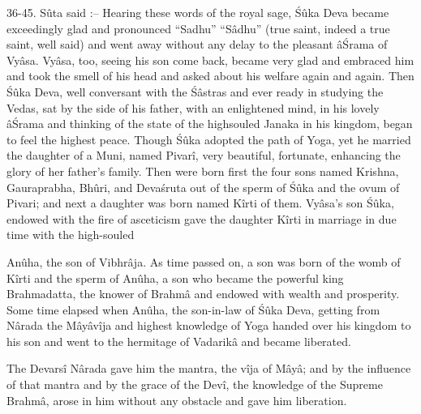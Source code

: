 36-45. S\^uta said :-- Hearing these words of the royal sage, \'S\^uka Deva became exceedingly glad and pronounced ``Sadhu'' ``S\^adhu'' (true saint, indeed a true saint, well said) and went away without any delay to the pleasant \^a\'Srama of Vy\^asa. Vy\^asa, too, seeing his son come back, became very glad and embraced him and took the smell of his head and asked about his welfare again and again. Then \'S\^uka Deva, well conversant with the \'S\^astras and ever ready in studying the Vedas, sat by the side of his father, with an enlightened mind, in his lovely \^a\'Srama and thinking of the state of the highsouled Janaka in his kingdom, began to feel the highest peace. Though \'S\^uka adopted the path of Yoga, yet he married the daughter of a Muni, named Pivar\^i, very beautiful, fortunate, enhancing the glory of her father's family. Then were born first the four sons named Krishna, Gauraprabha, Bh\^uri, and Deva\'sruta out of the sperm of \'S\^uka and the ovum of Pivari; and next a daughter was born named K\^irti of them. Vy\^asa's son \'S\^uka, endowed with the fire of asceticism gave the daughter K\^irti in marriage in due time with the high-souled

An\^uha, the son of Vibhr\^aja. As time passed on, a son was born of the womb of K\^irti and the sperm of An\^uha, a son who became the powerful king Brahmadatta, the knower of Brahm\^a and endowed with wealth and prosperity. Some time elapsed when An\^uha, the son-in-law of \'S\^uka Deva, getting from N\^arada the M\^ay\^av\^ija and highest knowledge of Yoga handed over his kingdom to his son and went to the hermitage of Vadarik\^a and became liberated.

The Devars\^i N\^arada gave him the mantra, the v\^ija of M\^ay\^a; and by the influence of that mantra and by the grace of the Dev\^i, the knowledge of the Supreme Brahm\^a, arose in him without any obstacle and gave him liberation.

